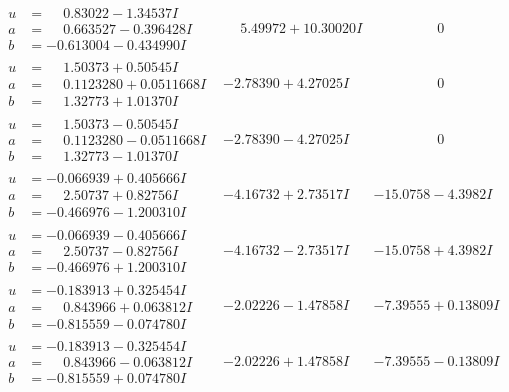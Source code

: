 \documentclass[1p]{elsarticle_modified}
\theoremstyle{definition}
\begin{document}
$$\begin{array}{c|c|c}
\begin{aligned}
u &= \phantom{-}0.83022 - 1.34537 I \\
a &= \phantom{-}0.663527 - 0.396428 I \\
b &= -0.613004 - 0.434990 I\end{aligned}
 & \phantom{-}5.49972 + 10.30020 I & \phantom{-0.000000 } 0 \\ \hline\begin{aligned}
u &= \phantom{-}1.50373 + 0.50545 I \\
a &= \phantom{-}0.1123280 + 0.0511668 I \\
b &= \phantom{-}1.32773 + 1.01370 I\end{aligned}
 & -2.78390 + 4.27025 I & \phantom{-0.000000 } 0 \\ \hline\begin{aligned}
u &= \phantom{-}1.50373 - 0.50545 I \\
a &= \phantom{-}0.1123280 - 0.0511668 I \\
b &= \phantom{-}1.32773 - 1.01370 I\end{aligned}
 & -2.78390 - 4.27025 I & \phantom{-0.000000 } 0 \\ \hline\begin{aligned}
u &= -0.066939 + 0.405666 I \\
a &= \phantom{-}2.50737 + 0.82756 I \\
b &= -0.466976 - 1.200310 I\end{aligned}
 & -4.16732 + 2.73517 I & -15.0758 - 4.3982 I \\ \hline\begin{aligned}
u &= -0.066939 - 0.405666 I \\
a &= \phantom{-}2.50737 - 0.82756 I \\
b &= -0.466976 + 1.200310 I\end{aligned}
 & -4.16732 - 2.73517 I & -15.0758 + 4.3982 I \\ \hline\begin{aligned}
u &= -0.183913 + 0.325454 I \\
a &= \phantom{-}0.843966 + 0.063812 I \\
b &= -0.815559 - 0.074780 I\end{aligned}
 & -2.02226 - 1.47858 I & -7.39555 + 0.13809 I \\ \hline\begin{aligned}
u &= -0.183913 - 0.325454 I \\
a &= \phantom{-}0.843966 - 0.063812 I \\
b &= -0.815559 + 0.074780 I\end{aligned}
 & -2.02226 + 1.47858 I & -7.39555 - 0.13809 I \\ \hline\begin{aligned}

\end{aligned}
\end{array}$$
\end{document}
